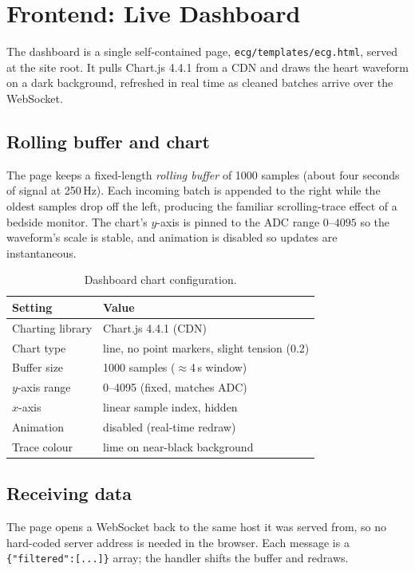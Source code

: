 \section{Frontend: Live Dashboard}

The dashboard is a single self-contained page,
\texttt{ecg/templates/ecg.html}, served at the site root. It pulls Chart.js
4.4.1 from a CDN and draws the heart waveform on a dark background, refreshed in
real time as cleaned batches arrive over the WebSocket.

\subsection{Rolling buffer and chart}
The page keeps a fixed-length \emph{rolling buffer} of 1000 samples (about four
seconds of signal at 250\,Hz). Each incoming batch is appended to the right while
the oldest samples drop off the left, producing the familiar scrolling-trace
effect of a bedside monitor. The chart's $y$-axis is pinned to the ADC range
$0$--$4095$ so the waveform's scale is stable, and animation is disabled so
updates are instantaneous.

\begin{table}[h]
  \centering\small
  \begin{tabular}{@{}ll@{}}
    \toprule
    \textbf{Setting} & \textbf{Value} \\
    \midrule
    Charting library   & Chart.js 4.4.1 (CDN) \\
    Chart type         & line, no point markers, slight tension (0.2) \\
    Buffer size        & 1000 samples ($\approx$4\,s window) \\
    $y$-axis range     & 0--4095 (fixed, matches ADC) \\
    $x$-axis           & linear sample index, hidden \\
    Animation          & disabled (real-time redraw) \\
    Trace colour       & lime on near-black background \\
    \bottomrule
  \end{tabular}
  \caption{Dashboard chart configuration.}
  \label{tab:chart}
\end{table}

\subsection{Receiving data}
The page opens a WebSocket back to the same host it was served from, so no
hard-coded server address is needed in the browser. Each message is a
\texttt{\{"filtered":[...]\}} array; the handler shifts the buffer and redraws.

